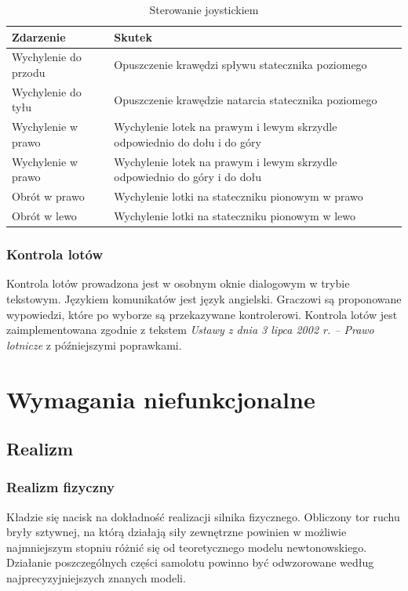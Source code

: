 \documentclass{mwrep}
\begin{document}
\begin{center}
\begin{table}[ht]
\begin{center}
\begin{tabularx}{1\textwidth}{|l|X|}
\hline
Zdarzenie & Skutek \\ \hline
Wychylenie do przodu & Opuszczenie krawędzi spływu statecznika poziomego \\
Wychylenie do tyłu & Opuszczenie krawędzie natarcia statecznika poziomego \\
Wychylenie w prawo & Wychylenie lotek na prawym i lewym skrzydle odpowiednio do dołu i do góry \\
Wychylenie w prawo & Wychylenie lotek na prawym i lewym skrzydle odpowiednio do góry i do dołu \\
Obrót w prawo & Wychylenie lotki na stateczniku pionowym w prawo \\
Obrót w lewo & Wychylenie lotki na stateczniku pionowym w lewo \\
\hline
\end{tabularx}
\end{center}
\vspace{3ex}
\caption{Sterowanie joystickiem}\label{T:Sterowanie_joystickiem}
\end{table}
\end{center}

\subsection{Kontrola lotów}

Kontrola lotów prowadzona jest w osobnym oknie dialogowym w trybie tekstowym. Językiem komunikatów jest język angielski. Graczowi są proponowane wypowiedzi, które po wyborze są przekazywane kontrolerowi. Kontrola lotów jest zaimplementowana zgodnie z tekstem \emph{Ustawy z dnia 3 lipca 2002 r. -- Prawo lotnicze} z późniejszymi poprawkami.

\chapter{Wymagania niefunkcjonalne}

\section{Realizm}
\subsection{Realizm fizyczny}
Kładzie się nacisk na dokładność realizacji silnika fizycznego. Obliczony tor ruchu bryły sztywnej, na którą działają siły zewnętrzne powinien w możliwie najmniejszym stopniu różnić się od teoretycznego modelu newtonowskiego.\\
Działanie poszczególnych części samolotu powinno być odwzorowane według najprecyzyjniejszych znanych modeli.
\end{document}
